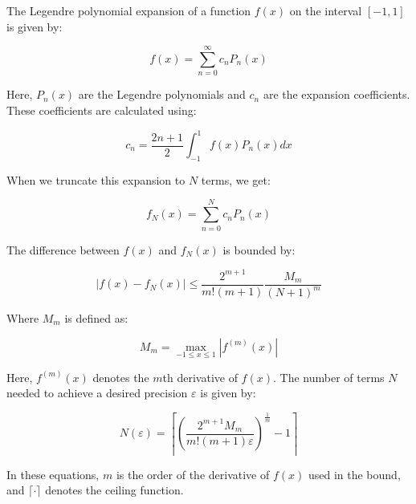 \documentclass{article}
\begin{document}
The Legendre polynomial expansion of a function $f(x)$ on the interval $[-1, 1]$ is given by:

\begin{equation}
f(x) = \sum_{n=0}^{\infty} c_n P_n(x)
\end{equation}

Here, $P_n(x)$ are the Legendre polynomials and $c_n$ are the expansion coefficients. These coefficients are calculated using:

\begin{equation}
c_n = \frac{2n + 1}{2} \int_{-1}^{1} f(x) P_n(x) dx
\end{equation}

When we truncate this expansion to $N$ terms, we get:

\begin{equation}
f_N(x) = \sum_{n=0}^{N} c_n P_n(x)
\end{equation}

The difference between $f(x)$ and $f_N(x)$ is bounded by:

\begin{equation}
|f(x) - f_N(x)| \leq \frac{2^{m+1}}{m!(m+1)} \frac{M_m}{(N+1)^m}
\end{equation}

Where $M_m$ is defined as:

\begin{equation}
M_m = \max_{-1 \leq x \leq 1} |f^{(m)}(x)|
\end{equation}

Here, $f^{(m)}(x)$ denotes the $m$th derivative of $f(x)$. The number of terms $N$ needed to achieve a desired precision $\varepsilon$ is given by:

\begin{equation}
N(\varepsilon) = \left\lceil\left(\frac{2^{m+1} M_m}{m!(m+1)\varepsilon}\right)^{\frac{1}{m}} - 1\right\rceil
\end{equation}

In these equations, $m$ is the order of the derivative of $f(x)$ used in the bound, and $\lceil \cdot \rceil$ denotes the ceiling function.
\end{document}
